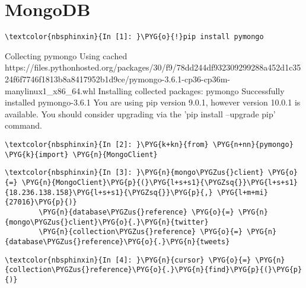 \documentclass[letterpaper,10pt,english]{sphinxmanual}
\begin{document}
\chapter{MongoDB}
\label{\detokenize{index:mongodb}}
%
\begin{Verbatim}[commandchars=\\\{\}]
\textcolor{nbsphinxin}{In [1]: }\PYG{o}{!}pip install pymongo
\end{Verbatim}



%
\begin{OriginalVerbatim}[commandchars=\\\{\}]
Collecting pymongo
  Using cached https://files.pythonhosted.org/packages/30/f9/78dd244df932309299288a452d1c3524f6f7746f1813b8a8417952b1d9ce/pymongo-3.6.1-cp36-cp36m-manylinux1\_x86\_64.whl
Installing collected packages: pymongo
Successfully installed pymongo-3.6.1
\textcolor{ansi-yellow}{You are using pip version 9.0.1, however version 10.0.1 is available.
You should consider upgrading via the 'pip install --upgrade pip' command.}
\end{OriginalVerbatim}
\relax

%
\begin{Verbatim}[commandchars=\\\{\}]
\textcolor{nbsphinxin}{In [2]: }\PYG{k+kn}{from} \PYG{n+nn}{pymongo} \PYG{k}{import} \PYG{n}{MongoClient}
\end{Verbatim}

%
\begin{Verbatim}[commandchars=\\\{\}]
\textcolor{nbsphinxin}{In [3]: }\PYG{n}{mongo\PYGZus{}client} \PYG{o}{=} \PYG{n}{MongoClient}\PYG{p}{(}\PYG{l+s+s1}{\PYGZsq{}}\PYG{l+s+s1}{18.236.138.158}\PYG{l+s+s1}{\PYGZsq{}}\PYG{p}{,} \PYG{l+m+mi}{27016}\PYG{p}{)}
        \PYG{n}{database\PYGZus{}reference} \PYG{o}{=} \PYG{n}{mongo\PYGZus{}client}\PYG{o}{.}\PYG{n}{twitter}
        \PYG{n}{collection\PYGZus{}reference} \PYG{o}{=} \PYG{n}{database\PYGZus{}reference}\PYG{o}{.}\PYG{n}{tweets}
\end{Verbatim}

%
\begin{Verbatim}[commandchars=\\\{\}]
\textcolor{nbsphinxin}{In [4]: }\PYG{n}{cursor} \PYG{o}{=} \PYG{n}{collection\PYGZus{}reference}\PYG{o}{.}\PYG{n}{find}\PYG{p}{(}\PYG{p}{)}
\end{Verbatim}
\end{document}
